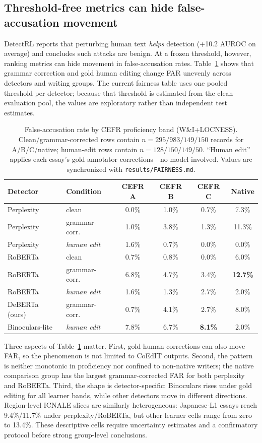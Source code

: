 \documentclass[11pt]{article}
\begin{document}
\subsection{Threshold-free metrics can hide false-accusation movement}
\label{sec:fairness}

DetectRL \citep{wu2024detectrl} reports that perturbing human text
\emph{helps} detection (+10.2 AUROC on average) and concludes such attacks are
benign. At a frozen threshold, however, ranking metrics can hide movement in
false-accusation rates. Table~\ref{tab:cefr} shows that grammar correction and
gold human editing change FAR unevenly across detectors and writing groups.
The current fairness table uses one pooled threshold per detector; because that
threshold is estimated from the clean evaluation pool, the values are
exploratory rather than independent test estimates.

\begin{table}[t]
\centering
\small
\begin{tabular}{llcccc}
\toprule
Detector & Condition & CEFR A & CEFR B & CEFR C & Native \\
\midrule
Perplexity & clean             & 0.0\% & 1.0\% & 0.7\% & 7.3\% \\
Perplexity & grammar-corr.     & 1.0\% & 3.8\% & 1.3\% & 11.3\% \\
Perplexity & \emph{human edit} & 1.6\% & 0.7\% & 0.0\% & 0.0\% \\
RoBERTa    & clean             & 0.7\% & 0.8\% & 0.0\% & 6.0\% \\
RoBERTa    & grammar-corr.     & 6.8\% & 4.7\% & 3.4\% & \textbf{12.7\%} \\
RoBERTa    & \emph{human edit} & 1.6\% & 1.3\% & 2.7\% & 2.0\% \\
DeBERTa (ours) & grammar-corr. & 0.7\% & 4.1\% & 2.7\% & 8.0\% \\
Binoculars-lite & \emph{human edit} & 7.8\% & 6.7\% & \textbf{8.1\%} & 2.0\% \\
\bottomrule
\end{tabular}
\caption{False-accusation rate by CEFR proficiency band (W\&I+LOCNESS).
Clean/grammar-corrected rows contain $n=295/983/149/150$ records for
A/B/C/native; human-edit rows contain $n=128/150/149/50$.
``Human edit'' applies each essay's gold annotator corrections---no model
involved. Values are synchronized with \texttt{results/FAIRNESS.md}.}
\label{tab:cefr}
\end{table}

Three aspects of Table~\ref{tab:cefr} matter. First, gold human corrections can
also move FAR, so the phenomenon is not limited to CoEdIT outputs. Second, the
pattern is neither monotonic in proficiency nor confined to non-native writers;
the native comparison group has the largest grammar-corrected FAR for both
perplexity and RoBERTa. Third, the shape is detector-specific: Binoculars rises
under gold editing for all learner bands, while other detectors move in
different directions. Region-level ICNALE slices are similarly heterogeneous:
Japanese-L1 essays reach 9.4\%/11.7\% under perplexity/RoBERTa, but other learner
cells range from zero to 13.4\%. These descriptive cells require uncertainty
estimates and a confirmatory protocol before strong group-level conclusions.
\end{document}
